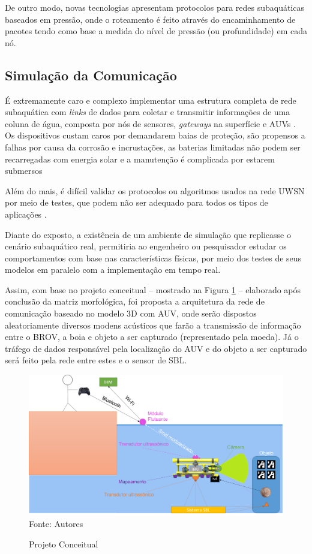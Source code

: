 De outro modo, novas tecnologias apresentam protocolos para redes subaquáticas baseados em pressão, onde o roteamento é feito através do encaminhamento de pacotes tendo como base a medida do nível de pressão (ou profundidade) em cada nó.


\subsection{Simulação da Comunicação}
\label{subsec:simulacao-da-comunicacao}

É extremamente caro e complexo implementar uma estrutura completa de rede subaquática com \textit{links} de dados para coletar e transmitir informações de uma coluna de água, composta por nós de sensores, \textit{gateways} na superfície e AUVs \cite{godi2021survey}. Os dispositivos custam caros por demandarem baias de proteção, são propensos a falhas por causa da corrosão e incrustações, as baterias limitadas não podem ser recarregadas com energia solar e a manutenção é complicada por estarem submersos \cite{akyildiz2005underwater, shantaram2005challenges}

Além do mais, é difícil validar os protocolos ou algoritmos usados na rede UWSN por meio de testes, que podem não ser adequado para todos os tipos de aplicações \cite{das2016simulation}.  

Diante do exposto, a existência de um ambiente de simulação que replicasse o cenário subaquático real, permitiria ao engenheiro ou pesquisador estudar os comportamentos com base nas características físicas, por meio dos testes de seus modelos em paralelo com a implementação em tempo real.

Assim, com base no projeto conceitual -- mostrado na Figura \ref{fig:conceito-final} -- elaborado após conclusão da matriz morfológica, foi proposta a arquitetura da rede de comunicação baseado no modelo 3D com AUV, onde serão dispostos aleatoriamente diversos modens acústicos que farão a transmissão de informação entre o BROV, a boia e objeto a ser capturado (representado pela moeda). Já o tráfego de dados responsável pela localização do AUV e do objeto a ser capturado será feito pela rede entre estes e o sensor de SBL.

\begin{figure}[h]
	\centering
	\caption[Projeto Conceitual]{Projeto Conceitual}
	\label{fig:conceito-final}
	\includegraphics[width=0.8\linewidth]{images/conceito-final}\\
	\footnotesize Fonte: Autores
\end{figure}

